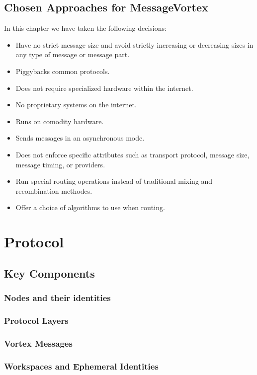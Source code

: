 \section{Chosen Approaches for MessageVortex}
In this chapter we have taken the following decisions:
\begin{itemize}
	\item Have no strict message size and avoid strictly increasing or decreasing sizes in any type of message or message part.
	\item Piggybacks common protocols.
	\item Does not require specialized hardware within the internet.
	\item No proprietary systems on the internet.
	\item Runs on comodity hardware.
	\item Sends messages in an asynchronous mode.
	\item Does not enforce specific attributes such as transport protocol, message size, message timing, or providers.
	\item Run special routing operations instead of traditional mixing and recombination methodes.
	\item Offer a choice of algorithms to use when routing.
\end{itemize}


\chapter{Protocol}
\section{Key Components}
\subsection{Nodes and their identities}
\subsection{Protocol Layers}
\subsection{Vortex Messages}
\subsection{Workspaces and Ephemeral Identities}
